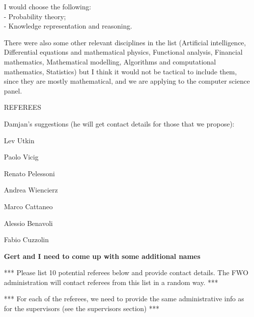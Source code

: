 \documentclass[11pt,dvipsnames,usenames,a4paper]{article}
\begin{document}
I would choose the following:\\[5pt]
- Probability theory;\\
- Knowledge representation and reasoning.

There were also some other relevant disciplines in the list (Artificial intelligence, Differential equations and mathematical physics, Functional analysis, Financial mathematics, Mathematical modelling, Algorithms and computational mathematics, Statistics) but I think it would not be tactical to include them, since they are mostly mathematical, and we are applying to the computer science panel.


\vspace{5mm}

\begin{shaded}\centering REFEREES \end{shaded}

Damjan's suggestions (he will get contact details for those that we propose):

Lev Utkin

Paolo Vicig

Renato Pelessoni

Andrea Wiencierz

Marco Cattaneo

Alessio Benavoli

Fabio Cuzzolin


{\bf\color{blue} Gert and I need to come up with some additional names}


*** Please list 10 potential referees below and provide contact details.
The FWO administration will contact referees from this list in a random way. ***

*** For each of the referees, we need to provide the same administrative info as for the supervisors (see the supervisors section) ***
\end{document}
